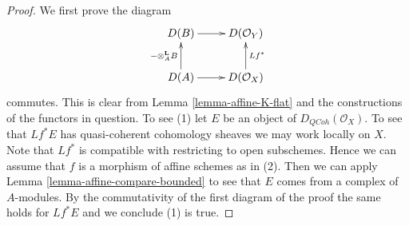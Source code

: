 \documentclass{stacks-project}
\theoremstyle{plain}
\theoremstyle{definition}
\theoremstyle{remark}
\numberwithin{equation}{subsection}
\def\QCoh{\mathit{QCoh}}
\begin{document}
\begin{proof}
We first prove the diagram
$$
\xymatrix{
D(B) \ar[r] & D(\mathcal{O}_Y) \\
D(A) \ar[r] \ar[u]^{- \otimes_A^\mathbf{L} B} &
D(\mathcal{O}_X) \ar[u]_{Lf^*}
}
$$
commutes. This is clear from Lemma \ref{lemma-affine-K-flat} and
the constructions of the functors in question. To see (1) let
$E$ be an object of $D_\QCoh(\mathcal{O}_X)$. To see that
$Lf^*E$ has quasi-coherent cohomology sheaves we may work locally on $X$.
Note that $Lf^*$ is compatible with restricting to open subschemes.
Hence we can assume that $f$ is a morphism of affine schemes as in (2).
Then we can apply Lemma \ref{lemma-affine-compare-bounded} to see that
$E$ comes from a complex of $A$-modules. By the commutativity of the first
diagram of the proof the same holds for $Lf^*E$ and we conclude (1) is true.
\end{proof}
\end{document}
